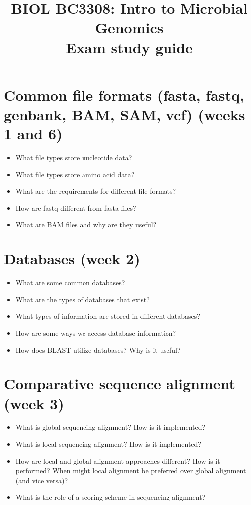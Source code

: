 \documentclass{article}
\title{BIOL BC3308: Intro to Microbial Genomics\\
Exam study guide}
\date{}
\begin{document}
\maketitle{} \noindent
% 
\section{Common file formats (fasta, fastq, genbank, BAM, SAM, vcf) (weeks 1 and 6)}
\begin{itemize}
    \item What file types store nucleotide data?
    \item What file types store amino acid data?
    \item What are the requirements for different file formats? 
    \item How are fastq different from fasta files?
    \item What are BAM files and why are they useful?
\end{itemize}

\section{Databases (week 2)}
\begin{itemize}
    \item What are some common databases?
    \item What are the types of databases that exist? 
    \item What types of information are stored in different databases?
    \item How are some ways we access database information?
    \item How does BLAST utilize databases? Why is it useful?
\end{itemize}

\section{Comparative sequence alignment (week 3)}
\begin{itemize}
    \item What is global sequencing alignment? How is it implemented?
    \item What is local sequencing alignment? How is it implemented?
    \item How are local and global alignment approaches different? How is it performed? When might local alignment be preferred over global alignment (and vice versa)?
    \item What is the role of a scoring scheme in sequencing alignment?
\end{itemize}
\end{document}
